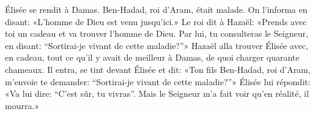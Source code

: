 Élisée se rendit à Damas.
Ben-Hadad, roi d’Aram, était malade.
	On l’informa en disant: «L’homme de Dieu est venu jusqu’ici.»
Le roi dit à Hazaël:
	«Prends avec toi un cadeau et va trouver l’homme de Dieu.
	Par lui, tu consulteras le Seigneur, en disant:
	“Sortirai-je vivant de cette maladie?”»
Hazaël alla trouver Élisée avec, en cadeau, tout ce qu’il y avait de meilleur à Damas,
	de quoi charger quarante chameaux.
Il entra, se tint devant Élisée et dit:
	«Ton fils Ben-Hadad, roi d’Aram, m’envoie te demander:
	“Sortirai-je vivant de cette maladie?”»
Élisée lui répondit:
	«Va lui dire: “C’est sûr, tu vivras”.
Mais le Seigneur m’a fait voir qu’en réalité, il mourra.»
